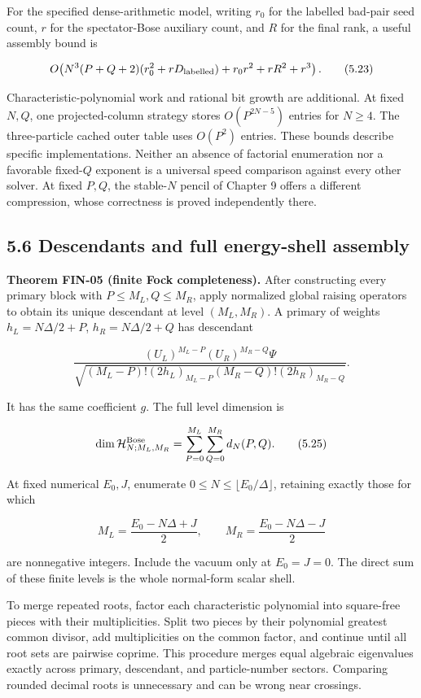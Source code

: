 \documentclass[a4paper,11pt]{article}
\numberwithin{equation}{section}
\begin{document}
For the specified dense-arithmetic model, writing \(r_0\) for the labelled bad-pair seed count, \(r\) for the spectator-Bose auxiliary count, and \(R\) for the final rank, a useful assembly bound is

\[
O\!\left(N^3(P+Q+2)(r_0^2+rD_{\rm labelled})
+r_0r^2+rR^2+r^3\right).
\tag{5.23}
\]

Characteristic-polynomial work and rational bit growth are additional. At fixed \(N,Q\), one projected-column strategy stores \(O(P^{2N-5})\) entries for \(N\ge4\). The three-particle cached outer table uses \(O(P^2)\) entries. These bounds describe specific implementations. Neither an absence of factorial enumeration nor a favorable fixed-\(Q\) exponent is a universal speed comparison against every other solver. At fixed \(P,Q\), the stable-\(N\) pencil of Chapter 9 offers a different compression, whose correctness is proved independently there.

\hypertarget{descendants-and-full-energy-shell-assembly}{%
\subsection{5.6 Descendants and full energy-shell assembly}\label{descendants-and-full-energy-shell-assembly}}

\textbf{Theorem FIN-05 (finite Fock completeness).} After constructing every primary block with \(P\le M_L,Q\le M_R\), apply normalized global raising operators to obtain its unique descendant at level \((M_L,M_R)\). A primary of weights \(h_L=N\Delta/2+P\), \(h_R=N\Delta/2+Q\) has descendant

\[
\frac{(U_L)^{M_L-P}(U_R)^{M_R-Q}\Psi}
{\sqrt{(M_L-P)!(2h_L)_{M_L-P}(M_R-Q)!(2h_R)_{M_R-Q}}}.
\tag{5.24}
\]

It has the same coefficient \(g\). The full level dimension is

\[
\dim\mathcal H^{\rm Bose}_{N;M_L,M_R}
=\sum_{P=0}^{M_L}\sum_{Q=0}^{M_R}d_N(P,Q).
\tag{5.25}
\]

At fixed numerical \(E_0,J\), enumerate \(0\le N\le\lfloor E_0/\Delta\rfloor\), retaining exactly those for which

\[
M_L=\frac{E_0-N\Delta+J}{2},\qquad
M_R=\frac{E_0-N\Delta-J}{2}
\tag{5.26}
\]

are nonnegative integers. Include the vacuum only at \(E_0=J=0\). The direct sum of these finite levels is the whole normal-form scalar shell.

To merge repeated roots, factor each characteristic polynomial into square-free pieces with their multiplicities. Split two pieces by their polynomial greatest common divisor, add multiplicities on the common factor, and continue until all root sets are pairwise coprime. This procedure merges equal algebraic eigenvalues exactly across primary, descendant, and particle-number sectors. Comparing rounded decimal roots is unnecessary and can be wrong near crossings.
\end{document}
